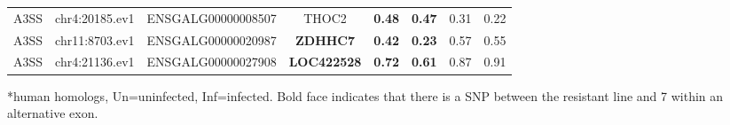 \documentclass[10pt]{article}
\begin{document}
\begin{table}[!ht]
\begin{tabular}{cccccccc}
A3SS & chr4:20185.ev1 & ENSGALG00000008507 & THOC2 & \textbf{0.48} & \textbf{0.47} & 0.31 & 0.22 \\
A3SS & chr11:8703.ev1 & ENSGALG00000020987 & \textbf{ZDHHC7} & \textbf{0.42} & \textbf{0.23} & 0.57 & 0.55 \\
A3SS & chr4:21136.ev1 & ENSGALG00000027908 & \textbf{LOC422528} & \textbf{0.72} & \textbf{0.61} & 0.87 & 0.91 \\
\hline
\end{tabular}
\begin{flushleft}
    *human homologs, Un=uninfected, Inf=infected.
    Bold face indicates that there is a SNP between the resistant line and 7 within an alternative exon.
\end{flushleft}
\label{tab:line67i_diff_line67u_two}
\end{table}
\end{document}
